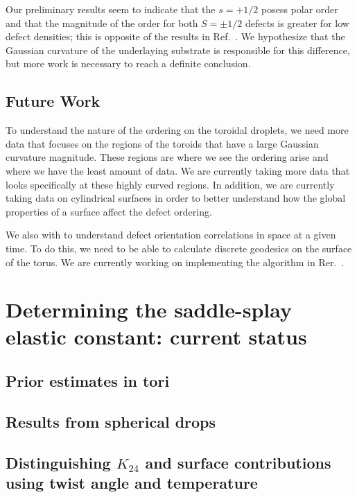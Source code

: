 Our preliminary results seem to indicate that the $s = +1/2$ posess polar order and that the magnitude of the order for both $S = \pm 1/2$ defects is greater for low defect densities; this is opposite of the results in Ref.~\cite{RN27}.
We hypothesize that the Gaussian curvature of the underlaying substrate is responsible for this difference, but more work is necessary to reach a definite conclusion.


\subsection{Future Work}
To understand the nature of the ordering on the toroidal droplets, we need more data that focuses on the regions of the toroids that have a large Gaussian curvature magnitude.
These regions are where we see the ordering arise and where we have the least amount of data.
We are currently taking more data that looks specifically at these highly curved regions.
In addition, we are currently taking data on cylindrical surfaces in order to better understand how the global properties of a surface affect the defect ordering.

We also with to understand defect orientation correlations in space at a given time.
To do this, we need to be able to calculate discrete geodesics on the surface of the torus.
We are currently working on implementing the algorithm in Rer.~.



\section{Determining the saddle-splay elastic constant: current status}
\subsection{Prior estimates in tori}
\subsection{Results from spherical drops}
\subsection{Distinguishing $K_{24}$ and surface contributions using twist angle and temperature}
